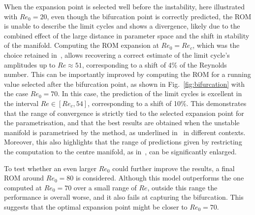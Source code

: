 \documentclass[%
reprint,
superscriptaddress,
 amsmath,amssymb,
 aps,
 pre
]{revtex4-2}
\newcommand{\alessio}[1]{\textcolor{cyan!80!black}{#1}}
\begin{document}
When the expansion point is selected well before the instability, here illustrated with $Re_0 = 20$, even though the bifurcation point is correctly predicted, the ROM is unable to describe the limit cycles and shows a divergence, likely due to the combined effect of the large distance in parameter space and the shift in stability of the manifold.
Computing the ROM expansion at $Re_0 = Re_c$, which was the choice retained in~\cite{Carini2015}, allows recovering a correct estimate of the limit cycle's amplitudes up to $Re \approx 51$, corresponding to a shift of 4\% of the Reynolds number. This can be importantly improved by computing the ROM for a running value selected after the bifurcation point, as shown in  Fig.~\ref{fig:bifurcation} with the case $Re_0=70$. In this case, the prediction of the limit cycles is excellent in the interval $Re \in [Re_c,54]$, corresponding to a shift of 10\%. This demonstrates that the range of convergence is strictly tied to the selected expansion point for the parametrisation, and that the best results are obtained when the unstable manifold is parametrised by the method, as underlined in~\cite{MingwuLi2024,Stabile:follow} in different contexts. Moreover, this also highlights that the range of predictions given by restricting the computation to the centre manifold, as in~\cite{Carini2015}, can be significantly enlarged.

To test whether an even larger $Re_0$ could further improve the results, a final ROM around $Re_0 = 80$ is considered. Although this model outperforms the one computed at $Re_0=70$ over a small range of $Re$, outside this range the performance is overall worse, and it also fails at capturing the bifurcation. This suggests that the optimal expansion point might be closer to $Re_0=70$.

\end{document}

